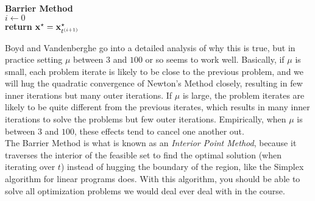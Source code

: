 \documentclass[12pt,letterpaper]{article}
\begin{document}
\IncMargin{1em}
\begin{algorithm}
    \textbf{Barrier Method}\\
    $i \leftarrow 0$\\
    \textbf{return } ${\bf x}^\star = {\bf x}_{t^{(i+1)}}^\star$
\end{algorithm}

Boyd and Vandenberghe go into a detailed analysis of why this is true, but in practice
setting $\mu$ between $3$ and $100$ or so seems to work well. Basically, if $\mu$ is small,
each problem iterate is likely to be close to the previous problem, and we will hug the
quadratic convergence of Newton's Method closely, resulting in few inner iterations but many
outer iterations. If $\mu$ is large, the problem iterates are likely to be quite different
from the previous iterates, which results in many inner iterations to solve the problems but
few outer iterations. Empirically, when $\mu$ is between $3$ and $100$, these effects tend to
cancel one another out.\\

The Barrier Method is what is known as an \textit{Interior Point Method}, because it traverses
the interior of the feasible set to find the optimal solution (when iterating over $t$) instead
of hugging the boundary of the region, like the Simplex algorithm for linear programs does. With
this algorithm, you should be able to solve all optimization problems we would deal ever deal with
in the course.
\end{document}
